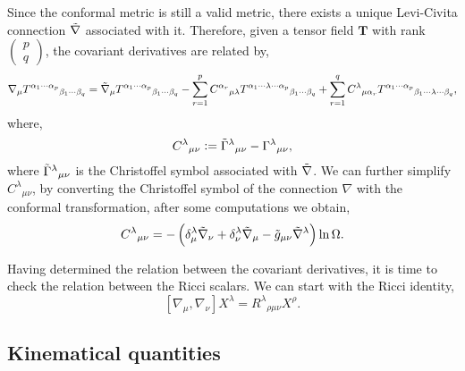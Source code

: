 Since the conformal metric is still a valid metric, there exists a unique Levi-Civita connection $\Tilde{\nabla}$ associated with it. Therefore, given a tensor field $\mathbf{T}$ with rank $\begin{pmatrix}p\\q\end{pmatrix}$, the covariant derivatives are related by,
\begin{equation}
    \nabla_\mu T^{\alpha_1\cdots \alpha_p}{}_{\beta_1\cdots\beta_q}=\Tilde{\nabla}_\mu T^{\alpha_1\cdots \alpha_p}{}_{\beta_1\cdots\beta_q} - \sum_{r=1}^p C^{\alpha_r}{}_{\mu\lambda}T^{\alpha_1\cdots \lambda \cdots \alpha_p}{}_{\beta_1\cdots\beta_q} + \sum_{r=1}^q C^{\lambda}{}_{\mu \alpha_r}T^{\alpha_1 \cdots \alpha_p}{}_{\beta_1\cdots \lambda\cdots\beta_q},
    \label{eqn:spacetime_cov_derivatives}
\end{equation}
where,
\begin{equation}
    C^\lambda{}_{\mu\nu}:=\Tilde{\Gamma}^\lambda{}_{\mu\nu}-\Gamma^\lambda{}_{\mu\nu},
\end{equation}
where $\Tilde{\Gamma}^\lambda{}_{\mu\nu}$ is the Christoffel symbol associated with $\Tilde{\nabla}$. We can further simplify $C^\lambda{}_{\mu\nu}$, by converting the Christoffel symbol of the connection $\nabla$ with the conformal transformation, after some computations we obtain,
\begin{equation}
    C^\lambda{}_{\mu\nu}=-\left(\delta^\lambda_\mu \Tilde{\nabla}_\nu + \delta^\lambda_\nu \Tilde{\nabla}_\mu - \Tilde{g}_{\mu\nu}\Tilde{\nabla}^\lambda\right)\ln\Omega.
    \label{eqn:dif_christ_C}
\end{equation}

Having determined the relation between the covariant derivatives, it is time to check the relation between the Ricci scalars. We can start with the Ricci identity,
\begin{equation}
    \left[\nabla_\mu,\nabla_\nu\right]X^\lambda=R^\lambda{}_{\rho\mu\nu}X^{\rho}.
\end{equation}









\subsection{Kinematical quantities}


